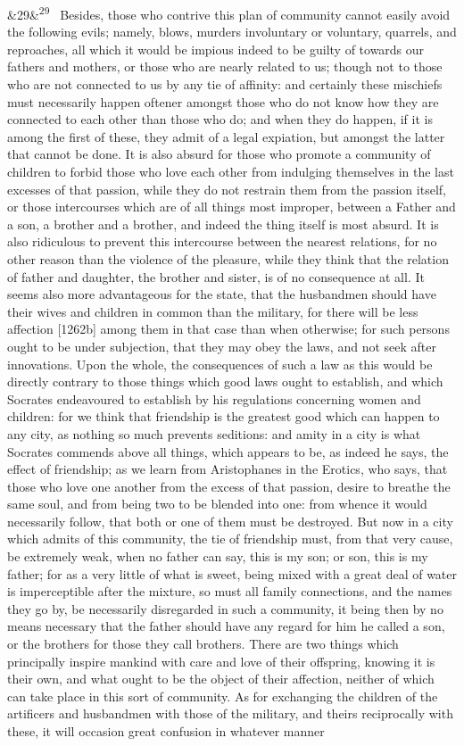 \documentclass[12pt]{article}
\newcommand{\para}[1][]{\par\noindent\ifx&#1&\else\textsuperscript{\footnotesize #1}~\fi}
\begin{document}
\para[29] Besides, those who contrive this plan of community cannot easily avoid the following evils; namely, blows, murders involuntary or voluntary, quarrels, and reproaches, all which it would be impious indeed to be guilty of towards our fathers and mothers, or those who are nearly related to us; though not to those who are not connected to us by any tie of affinity: and certainly these mischiefs must necessarily happen oftener amongst those who do not know how they are connected to each other than those who do; and when they do happen, if it is among the first of these, they admit of a legal expiation, but amongst the latter that cannot be done. It is also absurd for those who promote a community of children to forbid those who love each other from indulging themselves in the last excesses of that passion, while they do not restrain them from the passion itself, or those intercourses which are of all things most improper, between a Father and a son, a brother and a brother, and indeed the thing itself is most absurd. It is also ridiculous to prevent this intercourse between the nearest relations, for no other reason than the violence of the pleasure, while they think that the relation of father and daughter, the brother and sister, is of no consequence at all. It seems also more advantageous for the state, that the husbandmen should have their wives and children in common than the military, for there will be less affection [1262b] among them in that case than when otherwise; for such persons ought to be under subjection, that they may obey the laws, and not seek after innovations. Upon the whole, the consequences of such a law as this would be directly contrary to those things which good laws ought to establish, and which Socrates endeavoured to establish by his regulations concerning women and children: for we think that friendship is the greatest good which can happen to any city, as nothing so much prevents seditions: and amity in a city is what Socrates commends above all things, which appears to be, as indeed he says, the effect of friendship; as we learn from Aristophanes in the Erotics, who says, that those who love one another from the excess of that passion, desire to breathe the same soul, and from being two to be blended into one: from whence it would necessarily follow, that both or one of them must be destroyed. But now in a city which admits of this community, the tie of friendship must, from that very cause, be extremely weak, when no father can say, this is my son; or son, this is my father; for as a very little of what is sweet, being mixed with a great deal of water is imperceptible after the mixture, so must all family connections, and the names they go by, be necessarily disregarded in such a community, it being then by no means necessary that the father should have any regard for him he called a son, or the brothers for those they call brothers. There are two things which principally inspire mankind with care and love of their offspring, knowing it is their own, and what ought to be the object of their affection, neither of which can take place in this sort of community. As for exchanging the children of the artificers and husbandmen with those of the military, and theirs reciprocally with these, it will occasion great confusion in whatever manner 
\end{document}
